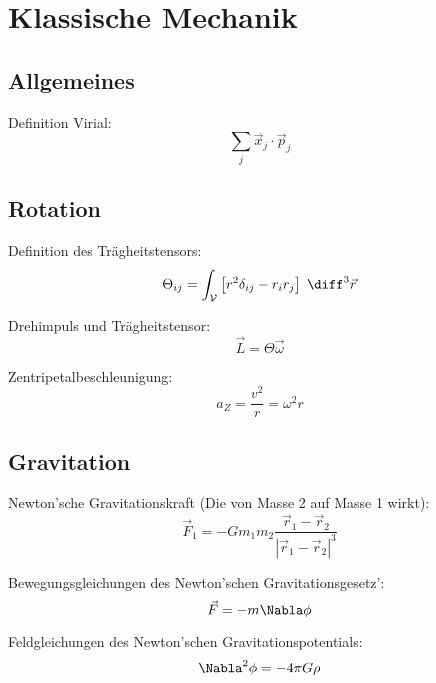 \documentclass[11pt]{article}
\numberwithin{equation}{section}
\begin{document}
      \newpage
    \section{Klassische Mechanik}

      \subsection{Allgemeines}
        Definition Virial:
        \begin{equation}
          \sum_j \vec{x}_j\cdot\vec{p}_j
        \end{equation}

      \subsection{Rotation}
        Definition des Trägheitstensors:
        \begin{equation}
          \Theta_{ij}=\int_{\mathcal{V}} \left[r^2\delta_{ij}-r_i r_j\right] \;\diff^3\vec{r}
        \end{equation}

        Drehimpuls und Trägheitstensor:
        \begin{equation}
          \vec{L}=\Theta\vec{\omega}
        \end{equation}

        Zentripetalbeschleunigung:
        \begin{equation}
          a_Z = \frac{v^2}{r} = \omega^2 r
        \end{equation}

      \subsection{Gravitation}
        Newton'sche Gravitationskraft (Die von Masse 2 auf Masse 1 wirkt):
        \begin{equation}
          \vec{F}_1 = - G m_1 m_2 \frac{\vec{r}_1-\vec{r}_2}{\left|\vec{r}_1-\vec{r}_2\right|^3}
        \end{equation}

        Bewegungsgleichungen des Newton'schen Gravitationsgesetz':
        \begin{equation}
          \vec{F}=-m\Nabla\phi
        \end{equation}

        Feldgleichungen des Newton'schen Gravitationspotentials:
        \begin{equation}
          \Nabla^2\phi=-4\pi G\rho
        \end{equation}
\end{document}
